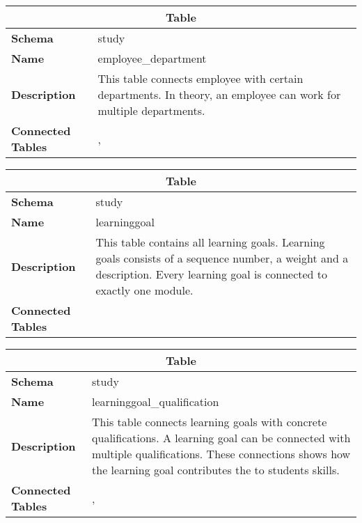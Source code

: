 \begin{table}[H]
	\label{table:employee_department}
	\centering
	\begin{tabular}{|p{}|p{}|}
		\hline
		\multicolumn{2}{|c|}{\textbf{Table}} \\ \hline
		\textbf{Schema}               & study \\ \hline
		\textbf{Name}                 & employee\_department \\ \hline
		\textbf{Description}          & This table connects employee with certain departments. In theory, an employee can work for multiple departments. \\ \hline
		\textbf{Connected Tables}     & \tableref{employee}, \tableref{department} \\ \hline
	\end{tabular}
\end{table}

\begin{table}[H]
	\label{table:learninggoal}
	\centering
	\begin{tabular}{|p{}|p{}|}
		\hline
		\multicolumn{2}{|c|}{\textbf{Table}} \\ \hline
		\textbf{Schema}               & study \\ \hline
		\textbf{Name}                 & learninggoal \\ \hline
		\textbf{Description}          & This table contains all learning goals. Learning goals consists of a sequence number, a weight and a description. Every learning goal is connected to exactly one module. \\ \hline
		\textbf{Connected Tables}     & \tableref{module} \\ \hline
	\end{tabular}
\end{table}

\begin{table}[H]
	\label{table:learninggoal_qualification}
	\centering
	\begin{tabular}{|p{}|p{}|}
		\hline
		\multicolumn{2}{|c|}{\textbf{Table}} \\ \hline
		\textbf{Schema}               & study \\ \hline
		\textbf{Name}                 & learninggoal\_qualification \\ \hline
		\textbf{Description}          & This table connects learning goals with concrete qualifications. A learning goal can be connected with multiple qualifications. These connections shows how the learning goal contributes the to students skills. \\ \hline
		\textbf{Connected Tables}     & \tableref{learninggoal}, \tableref{qualification} \\ \hline
	\end{tabular}
\end{table}

